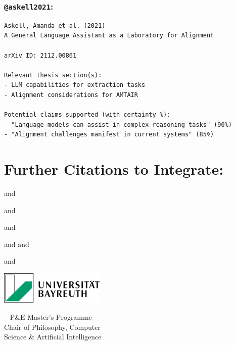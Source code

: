 \documentclass[
  11pt,
  letterpaper,
]{book}
\begin{document}
\subsubsection{\texorpdfstring{\texttt{@askell2021}:
\textcite{askell2021}}{@askell2021: @askell2021}}\label{askell2021-askell2021-1}

\begin{verbatim}
Askell, Amanda et al. (2021)
A General Language Assistant as a Laboratory for Alignment

arXiv ID: 2112.00861

Relevant thesis section(s):
- LLM capabilities for extraction tasks
- Alignment considerations for AMTAIR

Potential claims supported (with certainty %):
- "Language models can assist in complex reasoning tasks" (90%)
- "Alignment challenges manifest in current systems" (85%)
\end{verbatim}

\section{Further Citations to
Integrate:}\label{further-citations-to-integrate-1}

\textcite{growiec2024}

\textcite{clarke2022}

\textcite{drexler2019} and \textcite{drexler2019a}

\textcite{brundage2018} and \textcite{brundage2018a}

\textcite{kumar2019} and \textcite{kumar2019a}

\textcite{carlsmith2021} and \textcite{carlsmith2022} and
\textcite{carlsmith2024}

\textcite{hendrycks2021} and \textcite{hendrycks2021a}

\textcite{wilson2023}


\backmatter
\printbibliography[title=Bibliography]



\clearpage
\thispagestyle{empty} %

\newpage


\begin{minipage}{0.3\textwidth}
  \includegraphics[width=5cm]{latex/uni-bayreuth-logo.png}
\end{minipage}
\hfill
\begin{minipage}{0.9\textwidth}
  \begin{center}
    -- P\&E Master's Programme --\\
    Chair of Philosophy, Computer\\
    Science \& Artificial Intelligence
  \end{center}
\end{minipage}
\end{document}

